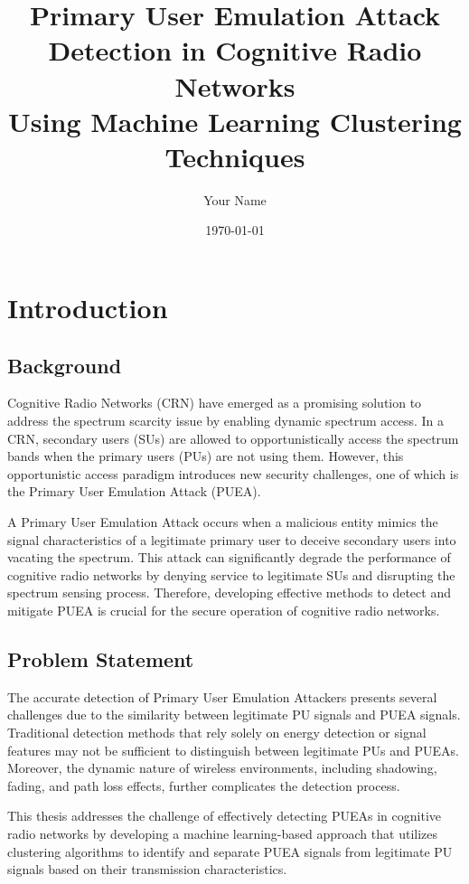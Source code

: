 \documentclass[12pt,a4paper]{report}
\title{Primary User Emulation Attack Detection in Cognitive Radio Networks\\
\large Using Machine Learning Clustering Techniques}
\author{Your Name}
\date{\today}
\begin{document}
\maketitle
\tableofcontents
\listoffigures
\listoftables

\chapter{Introduction}
\section{Background}
Cognitive Radio Networks (CRN) have emerged as a promising solution to address the spectrum scarcity issue by enabling dynamic spectrum access. In a CRN, secondary users (SUs) are allowed to opportunistically access the spectrum bands when the primary users (PUs) are not using them. However, this opportunistic access paradigm introduces new security challenges, one of which is the Primary User Emulation Attack (PUEA).

A Primary User Emulation Attack occurs when a malicious entity mimics the signal characteristics of a legitimate primary user to deceive secondary users into vacating the spectrum. This attack can significantly degrade the performance of cognitive radio networks by denying service to legitimate SUs and disrupting the spectrum sensing process. Therefore, developing effective methods to detect and mitigate PUEA is crucial for the secure operation of cognitive radio networks.

\section{Problem Statement}
The accurate detection of Primary User Emulation Attackers presents several challenges due to the similarity between legitimate PU signals and PUEA signals. Traditional detection methods that rely solely on energy detection or signal features may not be sufficient to distinguish between legitimate PUs and PUEAs. Moreover, the dynamic nature of wireless environments, including shadowing, fading, and path loss effects, further complicates the detection process.

This thesis addresses the challenge of effectively detecting PUEAs in cognitive radio networks by developing a machine learning-based approach that utilizes clustering algorithms to identify and separate PUEA signals from legitimate PU signals based on their transmission characteristics.
\end{document}

